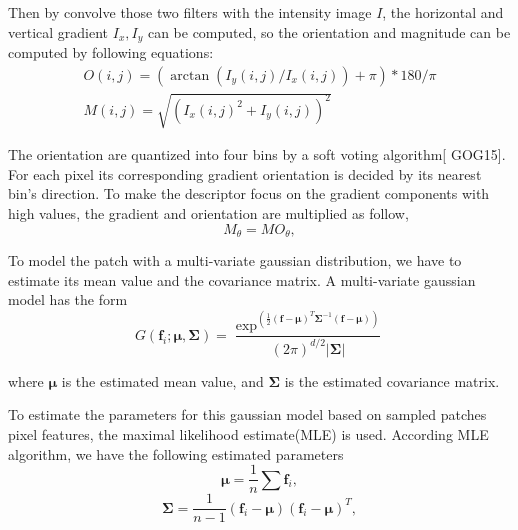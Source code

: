 Then by convolve those two filters with the intensity image $I$, the horizontal and vertical gradient $I_x, I_y$ can be computed, so the orientation and magnitude can be computed by following equations:
\begin{equation}
\begin{aligned}
O(i,j) = (\arctan(I_y(i,j)/I_x(i,j))+\pi)*180 /{\pi} \\
M(i,j) = \sqrt{(I_x(i,j)^2 + I_y(i,j))^2}
\end{aligned}
\end{equation}

The orientation are quantized into four bins by a soft voting algorithm[ GOG15]. For each pixel its corresponding gradient orientation is decided by its nearest bin's direction. To make the descriptor focus on the gradient components with high values, the gradient and orientation are multiplied as follow,
\begin{equation}
M_{\theta} = MO_{\theta},
\end{equation}


To model the patch with a multi-variate gaussian distribution, we have to estimate its mean value and the covariance matrix. A multi-variate gaussian model has the form
\begin{equation}
G(\bm{f}_i;\bm{\mu},\bm{\Sigma}) = \frac{\exp^{(\frac{1}{2}(\bm{f}-\bm{\mu})^T\bm{\Sigma}^{-1}(\bm{f}-\bm{\mu}))}}{(2\pi)^{d/2}|{\bm{\Sigma|}}} 
\end{equation}

where $\bm {\mu}$ is the estimated mean value, and $\bm {\Sigma} $ is the estimated covariance matrix. 

To estimate the parameters for this gaussian model based on sampled patches pixel features, the maximal likelihood estimate(MLE) is used. According MLE algorithm, we have the following estimated parameters
\begin{equation}
\bm{\mu} = \frac{1}{n}\sum \bm{f}_i,
\end{equation}
\begin{equation}
\bm{\Sigma} = \frac{1}{n-1} (\bm{f}_i-\bm{\mu})(\bm{f}_i-\bm{\mu})^T,
\end{equation}

